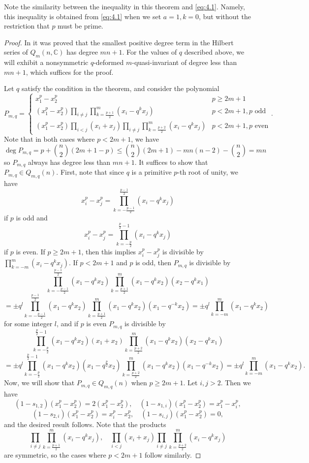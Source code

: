 \documentclass[11pt]{article}
\theoremstyle{definition}
\newcommand{\C}{\mathbb{C}}
\begin{document}
Note the similarity between the inequality in this theorem and \ref{eq:4.1}. Namely, this inequality is obtained from \ref{eq:4.1} when we set $a=1,k=0$, but without the restriction that $p$ must be prime.

\begin{proof}
    In \cite{felder2003action} it was proved that the smallest positive degree term in the Hilbert series of $Q_m(n,\C)$ has degree $mn+1$. For the values of $q$ described above, we will exhibit a nonsymmetric $q$-deformed $m$-quasi-invariant of degree less than $mn+1$, which suffices for the proof.
    
    Let $q$ satisfy the condition in the theorem, and consider the polynomial 
    \begin{equation}\label{eq:5.1}
        P_{m,q}=\begin{cases}x_1^p-x_2^p&p\geq 2m+1\\(x_1^p-x_2^p)\prod_{i\neq j}\prod_{k=\frac{p+1}{2}}^m(x_i-q^kx_j)&p<2m+1, p\text{ odd}\\(x_1^p-x_2^p)\prod_{i<j}(x_i+x_j)\prod_{i\neq j}\prod_{k=\frac{p+2}{2}}^m(x_i-q^kx_j)&p<2m+1, p\text{ even}
        \end{cases}.\tag{5.1}
    \end{equation}
    Note that in both cases where $p<2m+1$, we have 
    $$\deg P_{m,q}=p+{n\choose{2}}(2m+1-p)\leq{n\choose{2}}(2m+1)-mn(n-2)-{n\choose{2}}=mn$$
    so $P_{m,q}$ always has degree less than $mn+1$. It suffices to show that $P_{m,q}\in Q_{m,q}(n)$. First, note that since $q$ is a primitive $p$-th root of unity, we have $$x_i^p-x_j^p=\prod_{k=-\frac{p-1}{2}}^{\frac{p-1}{2}}(x_i-q^kx_j)$$
    if $p$ is odd and
    $$x_i^p-x_j^p=\prod_{k=-\frac{p}{2}}^{\frac{p}{2}-1}(x_i-q^kx_j)$$
    if $p$ is even. If $p\geq 2m+1$, then this implies $x_i^p-x_j^p$ is divisible by $\prod_{k=-m}^m(x_i-q^kx_j)$. If $p<2m+1$ and $p$ is odd, then $P_{m,q}$ is divisible by 
    $$\prod_{k=-\frac{p-1}{2}}^{\frac{p-1}{2}}(x_1-q^kx_2)\prod_{k=\frac{p+1}{2}}^m(x_1-q^kx_2)(x_2-q^kx_1)$$$$=\pm q^l\prod_{k=-\frac{p-1}{2}}^{\frac{p-1}{2}}(x_1-q^kx_2)\prod_{k=\frac{p+1}{2}}^m(x_1-q^kx_2)(x_1-q^{-k}x_2)=\pm q^l\prod_{k=-m}^m(x_1-q^kx_2)$$
    for some integer $l$, and if $p$ is even $P_{m,q}$ is divisible by
    $$\prod_{k=-\frac{p}{2}}^{\frac{p}{2}-1}(x_1-q^kx_2)(x_1+x_2)\prod_{k=\frac{p+2}{2}}^m(x_1-q^kx_2)(x_2-q^kx_1)$$$$=\pm q^l\prod_{k=-\frac{p}{2}}^{\frac{p}{2}-1}(x_1-q^kx_2)(x_1-q^{\frac{p}{2}}x_2)\prod_{k=\frac{p+2}{2}}^m(x_1-q^kx_2)(x_1-q^{-k}x_2)=\pm q^l\prod_{k=-m}^m(x_1-q^kx_2).$$
    Now, we will show that $P_{m,q}\in Q_{m,q}(n)$ when $p\geq 2m+1$. Let $i,j>2$. Then we have
    $$(1-s_{1,2})(x_1^p-x_2^p)=2(x_1^p-x_2^p),\quad(1-s_{1,i})(x_1^p-x_2^p)=x_1^p-x_i^p,$$
    $$(1-s_{2,i})(x_1^p-x_2^p)=x_i^p-x_2^p,\quad(1-s_{i,j})(x_1^p-x_2^p)=0,$$
    and the desired result follows. Note that the products 
    $$\prod_{i\neq j}\prod_{k=\frac{p+1}{2}}^m(x_i-q^kx_j),\quad \prod_{i<j}(x_i+x_j)\prod_{i\neq j}\prod_{k=\frac{p+2}{2}}^m(x_i-q^kx_j)$$
    are symmetric, so the cases where $p<2m+1$ follow similarly.
\end{proof}
\end{document}
